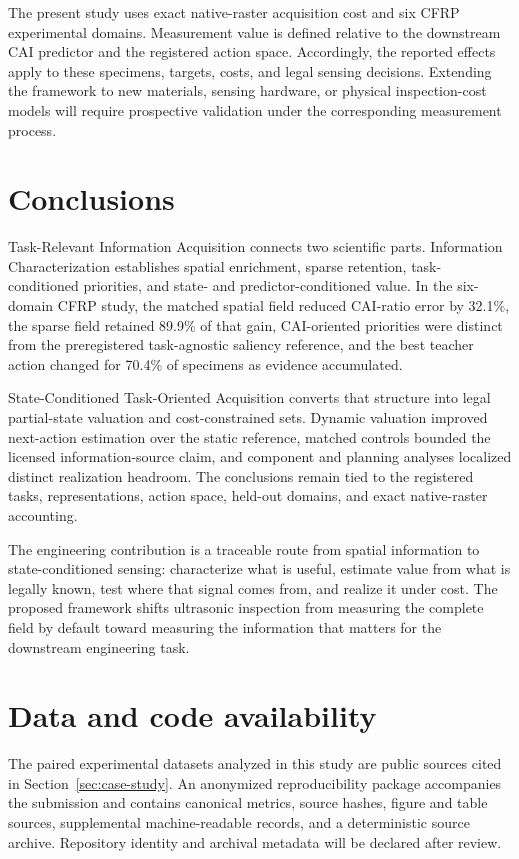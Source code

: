 \documentclass[preprint,12pt]{elsarticle}
\begin{document}
The present study uses exact native-raster acquisition cost and six CFRP
experimental domains. Measurement value is defined relative to the downstream
CAI predictor and the registered action space. Accordingly, the reported
effects apply to these specimens, targets, costs, and legal sensing decisions.
Extending the framework to new materials, sensing hardware, or physical
inspection-cost models will require prospective validation under the
corresponding measurement process.

\section{Conclusions}
\label{sec:conclusions}

Task-Relevant Information Acquisition connects two scientific parts. Information
Characterization establishes spatial enrichment, sparse retention, task-
conditioned priorities, and state- and predictor-conditioned value. In the
six-domain CFRP study, the matched spatial field reduced CAI-ratio error by
32.1\%, the sparse field retained 89.9\% of that gain, CAI-oriented priorities
were distinct from the preregistered task-agnostic saliency reference, and the
best teacher action changed for 70.4\% of specimens as evidence accumulated.

State-Conditioned Task-Oriented Acquisition converts that structure into legal
partial-state valuation and cost-constrained sets. Dynamic valuation improved
next-action estimation over the static reference, matched controls bounded the
licensed information-source claim, and component and planning analyses
localized distinct realization headroom. The conclusions remain tied to the
registered tasks, representations, action space, held-out domains, and exact
native-raster accounting.

The engineering contribution is a traceable route from spatial information to
state-conditioned sensing: characterize what is useful, estimate value from
what is legally known, test where that signal comes from, and realize it under
cost. The proposed framework shifts ultrasonic inspection from measuring the
complete field by default toward measuring the information that matters for
the downstream engineering task.

\section*{Data and code availability}
The paired experimental datasets analyzed in this study are public sources
cited in Section~\ref{sec:case-study}. An anonymized reproducibility package
accompanies the submission and contains canonical metrics, source hashes,
figure and table sources, supplemental machine-readable records, and a
deterministic source archive. Repository identity and archival metadata will
be declared after review.
\end{document}
